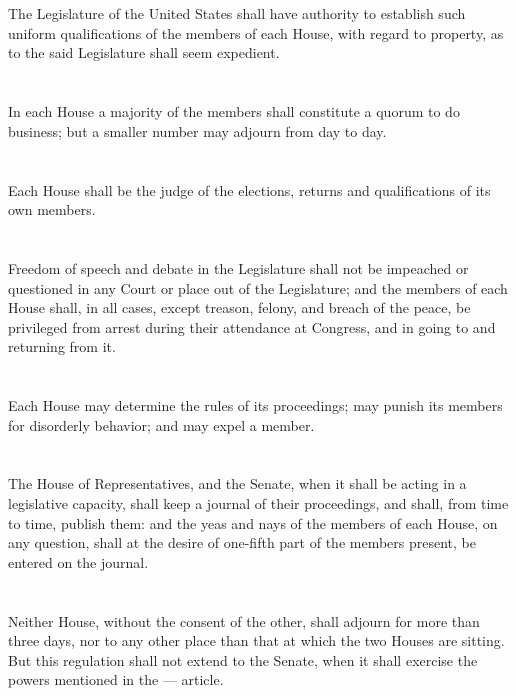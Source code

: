 \documentclass{constitution}
\begin{document}
\section{}
The Legislature of the United States shall have authority to establish such uniform qualifications of the members of each House, with regard to property,
as to the said Legislature shall seem expedient.

\section{}
In each House a majority of the members shall constitute a quorum to do business;
but a smaller number may adjourn from day to day.

\section{}
Each House shall be the judge of the elections, returns and qualifications of its own members.

\section{}
Freedom of speech and debate in the Legislature shall not be impeached or questioned in any Court or place out of the Legislature;
and the members of each House shall, in all cases, except treason, felony, and breach of the peace, be privileged from arrest during their attendance at Congress, and in going to and returning from it.

\section{}
Each House may determine the rules of its proceedings;
may punish its members for disorderly behavior;
and may expel a member.

\section{}
The House of Representatives,
and the Senate, when it shall be acting in a legislative capacity,
shall keep a journal of their proceedings,
and shall, from time to time, publish them:
and the yeas and nays of the members of each House, on any question, shall at the desire of one-fifth part of the members present, be entered on the journal.

\section{}
Neither House, without the consent of the other, shall adjourn for more than three days, nor to any other place than that at which the two Houses are sitting.
But this regulation shall not extend to the Senate, when it shall exercise the powers mentioned in the — article.
\end{document}
